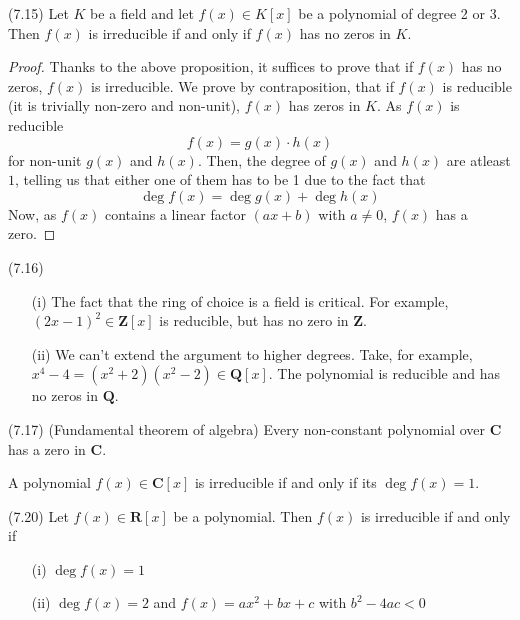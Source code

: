 \vspace{2ex}
\begin{prop}
(7.15) Let $K$ be a field and let $f(x)\in K[x]$ be a polynomial of degree 2 or 3. Then $f(x)$ is irreducible if and only if $f(x)$ has no zeros in $K$. 
\end{prop}
\vspace{2ex}
\begin{proof}
Thanks to the above proposition, it suffices to prove that if $f(x)$ has no zeros, $f(x)$ is irreducible. We prove by contraposition, that if $f(x)$ is reducible (it is trivially non-zero and non-unit), $f(x)$ has zeros in $K$. As $f(x)$ is reducible
\[f(x)=g(x)\cdot h(x)\]
for non-unit $g(x)$ and $h(x)$. Then, the degree of $g(x)$ and $h(x)$ are atleast $1$, telling us that either one of them has to be 1 due to the fact that
\[\mathop{\mathrm{deg}}f(x)=\mathop{\mathrm{deg}}g(x)+\mathop{\mathrm{deg}}h(x)\]
Now, as $f(x)$ contains a linear factor $(ax+b)$ with $a\ne 0$, $f(x)$ has a zero. 
\end{proof}
\vspace{2ex}
\begin{rmk}
(7.16) 
\begin{itemize}
\item[(i)] The fact that the ring of choice is a field is critical. For example, $(2x-1)^2\in {\bm Z}[x]$ is reducible, but has no zero in ${\bm Z}$. 
\item[(ii)] We can't extend the argument to higher degrees. Take, for example, $x^{4}-4=(x^2+2)(x^2-2)\in {\bm Q}[x]$. The polynomial is reducible and has no zeros in ${\bm Q}$. 
\end{itemize}
\end{rmk}
\vspace{2ex}
\begin{thm}
(7.17) (Fundamental theorem of algebra) Every non-constant polynomial over ${\bm C}$ has a zero in ${\bm C}$. 
\end{thm}
\vspace{2ex}
\begin{cor}
A polynomial $f(x)\in {\bm C}[x]$ is irreducible if and only if its $\mathop{\mathrm{deg}}f(x)=1$. 
\end{cor}
\vspace{2ex}
\begin{prop}
(7.20) Let $f(x)\in {\bm R}[x]$ be a polynomial. Then $f(x)$ is irreducible if and only if 
\begin{itemize}
\item[(i)] $\mathop{\mathrm{deg}}f(x)=1$
\item[(ii)] $\mathop{\mathrm{deg}}f(x)=2$ and $f(x)=ax^2+bx+c$ with $b^2-4ac<0$
\end{itemize}
\end{prop}

